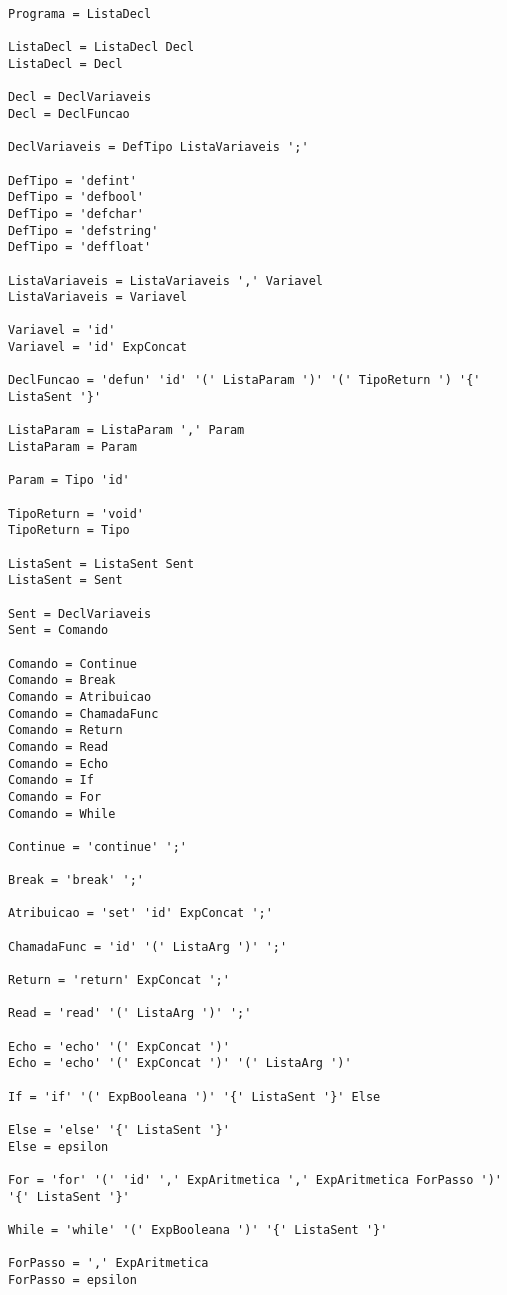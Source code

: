 \documentclass[
  12pt,				%
  oneside,			%
  a4paper,			%
  english,			%
  french,				%
  spanish,			%
  brazil,				%
]{abntex2}
\begin{document}
\begin{lstlisting}[label={code:gramatica-original},caption={Gramática
    original da linguagem de programação LisC.},style={mystyle}]
Programa = ListaDecl

ListaDecl = ListaDecl Decl
ListaDecl = Decl

Decl = DeclVariaveis
Decl = DeclFuncao

DeclVariaveis = DefTipo ListaVariaveis ';'

DefTipo = 'defint'
DefTipo = 'defbool'
DefTipo = 'defchar'
DefTipo = 'defstring'
DefTipo = 'deffloat'

ListaVariaveis = ListaVariaveis ',' Variavel
ListaVariaveis = Variavel

Variavel = 'id'
Variavel = 'id' ExpConcat

DeclFuncao = 'defun' 'id' '(' ListaParam ')' '(' TipoReturn ') '{' ListaSent '}'

ListaParam = ListaParam ',' Param
ListaParam = Param

Param = Tipo 'id'

TipoReturn = 'void'
TipoReturn = Tipo

ListaSent = ListaSent Sent
ListaSent = Sent

Sent = DeclVariaveis
Sent = Comando

Comando = Continue
Comando = Break
Comando = Atribuicao
Comando = ChamadaFunc
Comando = Return
Comando = Read
Comando = Echo
Comando = If
Comando = For
Comando = While

Continue = 'continue' ';'

Break = 'break' ';'

Atribuicao = 'set' 'id' ExpConcat ';'

ChamadaFunc = 'id' '(' ListaArg ')' ';'

Return = 'return' ExpConcat ';'

Read = 'read' '(' ListaArg ')' ';'

Echo = 'echo' '(' ExpConcat ')'
Echo = 'echo' '(' ExpConcat ')' '(' ListaArg ')'

If = 'if' '(' ExpBooleana ')' '{' ListaSent '}' Else

Else = 'else' '{' ListaSent '}'
Else = epsilon

For = 'for' '(' 'id' ',' ExpAritmetica ',' ExpAritmetica ForPasso ')' '{' ListaSent '}'

While = 'while' '(' ExpBooleana ')' '{' ListaSent '}'

ForPasso = ',' ExpAritmetica
ForPasso = epsilon


\end{lstlisting}
\end{document}
